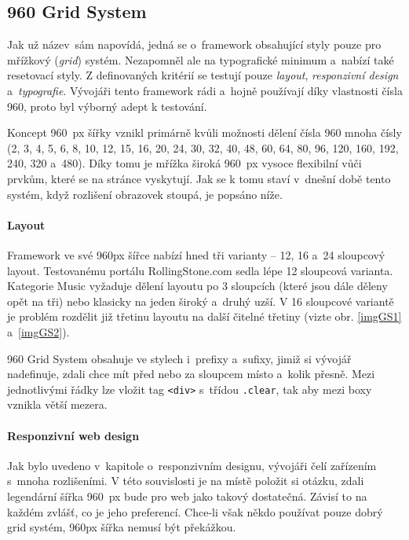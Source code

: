 \documentclass[thesis=B,czech]{FITthesis}[2012/06/26]
\begin{document}
\subsection{960 Grid System} \label{sec:gs}

Jak už název~sám napovídá, jedná se o~framework obsahující styly pouze pro mřížkový (\textit{grid})  systém. Nezapomněl ale na typografické minimum a~nabízí také resetovací styly. Z definovaných kritérií se testují pouze \textit{layout}, \textit{responzivní design} a~\textit{typografie}. Vývojáři tento framework rádi a~hojně používají díky vlastnosti čísla 960, proto byl výborný adept k testování.

Koncept 960~px šířky vznikl primárně kvůli možnosti dělení čísla 960 mnoha čísly (2, 3, 4, 5, 6, 8, 10, 12, 15, 16, 20, 24, 30, 32, 40, 48, 60, 64, 80, 96, 120, 160, 192, 240, 320 a~480). Díky tomu je mřížka široká 960~px vysoce flexibilní vůči prvkům, které se na stránce vyskytují. Jak se k tomu staví v~dnešní době tento systém, když rozlišení obrazovek stoupá, je popsáno níže.

\paragraph{Layout}

Framework ve své 960px šířce nabízí hned tři varianty -- 12, 16 a~24 sloupcový layout. Testovanému portálu RollingStone.com sedla lépe 12 sloupcová varianta. Kategorie Music vyžaduje dělení layoutu po 3 sloupcích (které jsou dále děleny opět na tři) nebo klasicky na jeden široký a~druhý uzší. V 16 sloupcové variantě je problém rozdělit již třetinu layoutu na další čitelné třetiny (vizte obr. \ref{imgGS1} a~\ref{imgGS2}).



960 Grid System obsahuje ve stylech i~prefixy a~sufixy, jimiž si vývojář nadefinuje, zdali chce mít před nebo za sloupcem místo a~kolik přesně. Mezi jednotlivými řádky lze vložit tag \verb#<div># s~třídou \verb#.clear#, tak aby mezi boxy vznikla větší mezera.

\paragraph{Responzivní web design}

Jak bylo uvedeno v~kapitole o~responzivním designu, vývojáři čelí zařízením s~mnoha rozlišeními. V této souvislosti je na místě položit si otázku, zdali legendární šířka 960~px bude pro web jako takový dostatečná. Závisí to na každém zvlášť, co je jeho preferencí. Chce-li však někdo používat pouze dobrý grid  systém, 960px šířka nemusí být překážkou. 
\end{document}
